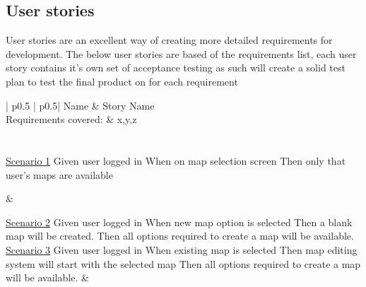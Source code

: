 \subsection{User stories}
User stories are an excellent way of creating more detailed requirements for development. The below user stories are based of the requirements list, each user story contains it's own set of acceptance testing as such will create a solid test plan to test the final product on for each requirement\\

\begin{longtable}{| p{} | p{}|}
	\hline
	Name & Story Name\\\hline
	Requirements covered: & x,y,z\\\hline
	\\\hline
	\\\hline
	\underline{Scenario 1}\newline
	Given user logged in \newline
	When on map selection screen \newline 
	Then only that user's maps are available\newline
	
	&
	
	\underline{Scenario 2}\newline
	Given user logged in \newline
	When new map option is selected \newline 
	Then a blank map will be created.\newline
	Then all options required to create a map will be available.\newline
	\\\hline
	\underline{Scenario 3}\newline
	Given user logged in \newline
	When existing map is selected \newline 
	Then map editing system will start with the selected map\newline
	Then all options required to create a map will be available.\newline
	&
	\\\hline
\end{longtable}

